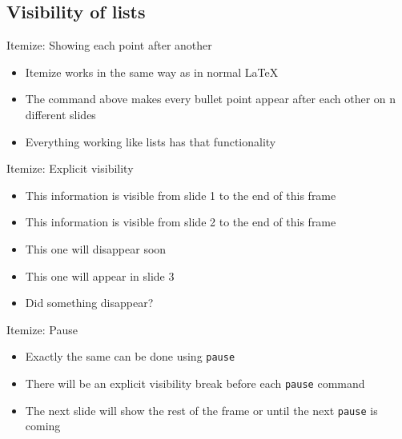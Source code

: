 \subsection*{Visibility of lists}
\begin{frame}{Itemize: Showing each point after another}
\begin{itemize}[<+->]
    \item Itemize works in the same way as in normal \LaTeX
    \item The command above makes every bullet point appear after each other on n different slides
    \item Everything working like lists has that functionality
\end{itemize}

\end{frame}

\begin{frame}{Itemize: Explicit visibility}
\begin{itemize}
    \item<1-> This information is visible from slide 1 to the end of this frame
    \item<2-> This information is visible from slide 2 to the end of this frame
    \item<2-3> This one will disappear soon
    \item<3-> This one will appear in slide 3
    \item<4-> Did something disappear?
\end{itemize}

\end{frame}

\begin{frame}{Itemize: Pause}
\begin{itemize}
    \item Exactly the same can be done using \texttt{pause}
    \item There will be an explicit visibility break before each \texttt{pause} command
    \pause
    \item The next slide will show the rest of the frame or until the next \texttt{pause} is coming
\end{itemize}

\end{frame}


